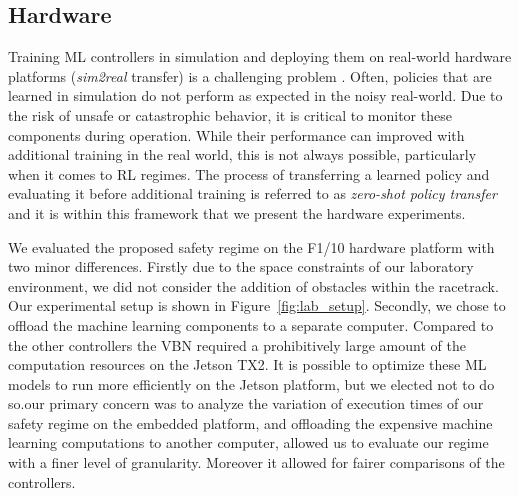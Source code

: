 \documentclass[manuscript,screen,review]{acmart}
\newcommand{\ttj}[1]{\textcolor{red}{\textbf{\underline{TTJ:}} #1}}
\begin{document}
\subsection{Hardware}
Training ML controllers in simulation and deploying them on real-world hardware platforms (\textit{sim2real} transfer) is a challenging problem \cite{jang2019ICCPS, kadian2019we}. Often, policies that are learned in simulation do not perform as expected in the noisy real-world. Due to the risk of unsafe or catastrophic behavior, it is critical to monitor these components during operation. While their performance can improved with additional training in the real world, this is not always possible, particularly when it comes to RL regimes. The process of transferring a learned policy and evaluating it before additional training is referred to as \emph{zero-shot policy transfer} and it is within this framework that we present the hardware experiments.


We evaluated the proposed safety regime on the F1/10 hardware platform with two minor differences. Firstly due to the space constraints of our laboratory environment, we did not consider the addition of obstacles within the racetrack. Our experimental setup is shown in Figure~\ref{fig:lab_setup}. Secondly, we chose to offload the machine learning components to a separate computer. Compared to the other controllers the VBN required a prohibitively large amount of the computation resources on the Jetson TX2. It is possible to optimize these ML models to run more efficiently on the Jetson platform, but we elected not to do so.our primary concern was to analyze the variation of execution times of our safety regime on the embedded platform, and offloading the expensive machine learning computations to another computer, allowed us to evaluate our regime with a finer level of granularity. Moreover it allowed for fairer comparisons of the controllers.






\end{document}

